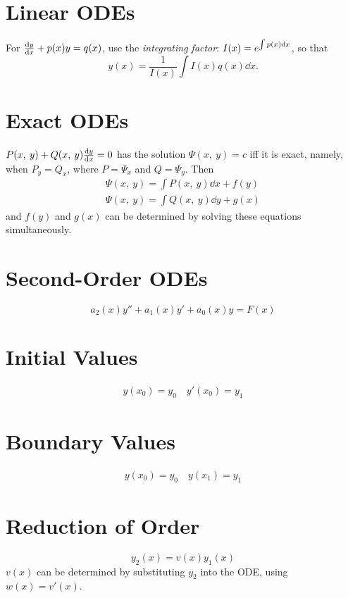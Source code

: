 \documentclass{article}
\begin{document}
\begin{multicols}{3}
    \section*{Linear ODEs}
    For $\dv{y}{x} + p(x)y = q(x)$, use the \textit{integrating factor}:
    $I(x) = e^{\int p(x) \dd{x}}$, so that
    \begin{equation*}
        y(x) = \frac{1}{I(x)} \int I(x) q(x) \dd{x}.
    \end{equation*}
    \section*{Exact ODEs}
    $P(x,\: y) + Q(x,\: y)\dv{y}{x} = 0$
    has the solution
    $\Psi(x,\: y) = c$
    iff it is exact, namely, when
    $P_y = Q_x$,
    where $P = \Psi_x$ and $Q = \Psi_y$. Then
    \begin{gather*}
        \Psi(x,\: y) = \int P(x,\: y) \dd{x} + f(y) \\
        \Psi(x,\: y) = \int Q(x,\: y) \dd{y} + g(x)
    \end{gather*}
    and $f(y)$ and $g(x)$ can be determined by solving these equations simultaneously.
    \section*{Second-Order ODEs}
    \begin{equation*}
        a_2(x)y'' + a_1(x)y' + a_0(x)y = F(x)
    \end{equation*}
    \section*{Initial Values}
    \begin{align*}
        y(x_0) = y_0 \quad y'(x_0) = y_1
    \end{align*}
    \section*{Boundary Values}
    \begin{align*}
        y(x_0) = y_0 \quad y(x_1) = y_1
    \end{align*}
    \section*{Reduction of Order}
    \begin{equation*}
        y_2(x) = v\left(x\right) y_1(x)
    \end{equation*}
    $v(x)$ can be determined by substituting $y_2$ into the ODE, using $w(x) = v'(x)$.

\end{multicols}
\end{document}
